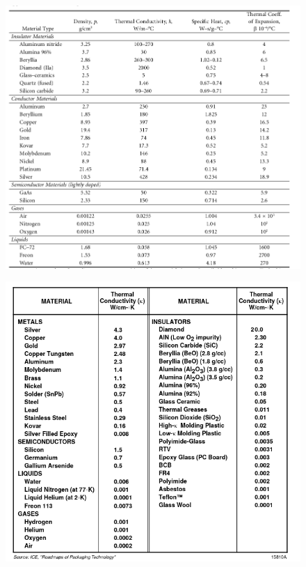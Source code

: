 \documentclass[final]{cubedoc}
\begin{document}
	\begin{figure}[h!]
		\centering
		\includegraphics[width=\linewidth]{docs/table_properties_blackwell_handbook.png}
		\caption{\cite[p.408]{blackwell2017electronic}}
		\label{fig:springer_properties}
	\end{figure}
	
	\begin{figure}[h!]
		\centering
		\includegraphics[width=\linewidth]{docs/table_properties_smith.png}
		\caption{\cite[6-14]{chip}}
		\label{fig:intel_conduct}
	\end{figure}
	
\end{document}
